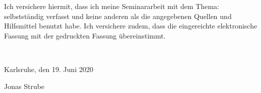 Ich versichere hiermit, dass ich meine Seminararbeit mit dem Thema: \textquote{\mytitle} selbstständig verfasst und keine anderen als die angegebenen Quellen und Hilfsmittel benutzt habe. Ich versichere zudem, dass die eingereichte elektronische Fassung mit der gedruckten Fassung übereinstimmt.

\mbox{}\vspace{4\baselineskip}\\

\parbox{7cm}{\centering Karlsruhe, den 19. Juni 2020
}
\hfill
\parbox{4cm}{
	\strut \centering Jonas Strube}

\mbox{}\vspace{4\baselineskip}\\
\clearpage%